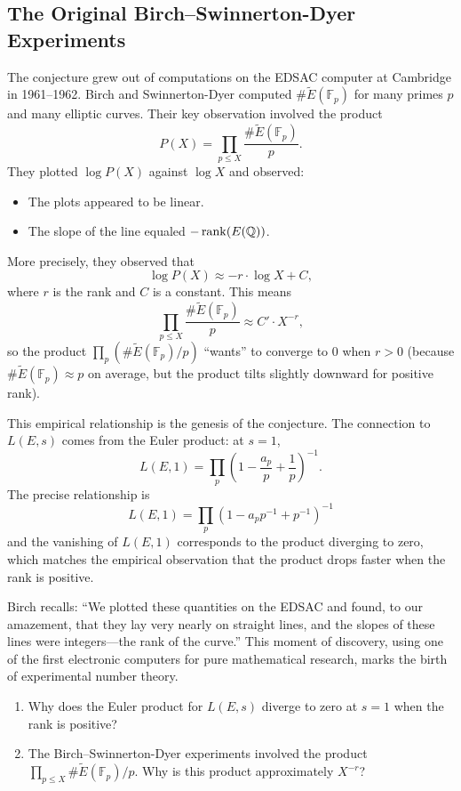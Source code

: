 \subsection{The Original Birch--Swinnerton-Dyer Experiments}

The conjecture grew out of computations on the EDSAC computer at Cambridge in 1961--1962. Birch and Swinnerton-Dyer computed $\#\widetilde{E}(\mathbb{F}_p)$ for many primes $p$ and many elliptic curves. Their key observation involved the product
\[
P(X) = \prod_{p \le X} \frac{\#\widetilde{E}(\mathbb{F}_p)}{p}.
\]
They plotted $\log P(X)$ against $\log X$ and observed:
\begin{itemize}
\item The plots appeared to be linear.
\item The slope of the line equaled $-\operatorname{rank}(E(\mathbb{Q}))$.
\end{itemize}

More precisely, they observed that
\[
\log P(X) \approx -r \cdot \log X + C,
\]
where $r$ is the rank and $C$ is a constant. This means
\[
\prod_{p \le X} \frac{\#\widetilde{E}(\mathbb{F}_p)}{p} \approx C' \cdot X^{-r},
\]
so the product $\prod_p (\#\widetilde{E}(\mathbb{F}_p)/p)$ ``wants'' to converge to 0 when $r > 0$ (because $\#\widetilde{E}(\mathbb{F}_p) \approx p$ on average, but the product tilts slightly downward for positive rank).

This empirical relationship is the genesis of the conjecture. The connection to $L(E, s)$ comes from the Euler product: at $s = 1$,
\[
L(E, 1) = \prod_p \left(1 - \frac{a_p}{p} + \frac{1}{p}\right)^{-1}.
\]
The precise relationship is
\[
L(E, 1) = \prod_p \left(1 - a_p p^{-1} + p^{-1}\right)^{-1}
\]
and the vanishing of $L(E, 1)$ corresponds to the product diverging to zero, which matches the empirical observation that the product drops faster when the rank is positive.

Birch recalls: ``We plotted these quantities on the EDSAC and found, to our amazement, that they lay very nearly on straight lines, and the slopes of these lines were integers---the rank of the curve.'' This moment of discovery, using one of the first electronic computers for pure mathematical research, marks the birth of experimental number theory.

\begin{checkyou}
\begin{enumerate}
\item Why does the Euler product for $L(E,s)$ diverge to zero at $s = 1$ when the rank is positive?
\item The Birch--Swinnerton-Dyer experiments involved the product $\prod_{p \le X} \#\widetilde{E}(\mathbb{F}_p)/p$. Why is this product approximately $X^{-r}$?
\end{enumerate}
\end{checkyou}

